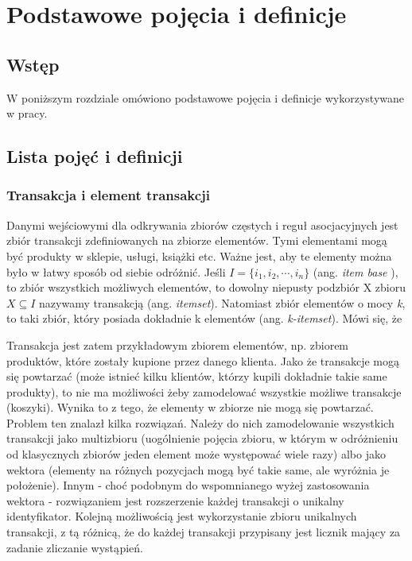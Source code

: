 \chapter{Podstawowe pojęcia i definicje}
\label{c2}

\section{Wstęp}
\label{c21}

W poniższym rozdziale omówiono podstawowe pojęcia i definicje wykorzystywane w pracy. 

\section{Lista pojęć i definicji}
\label{c22}

\subsection{Transakcja i element transakcji}
\label{c221}
Danymi wejściowymi dla odkrywania zbiorów częstych i reguł asocjacyjnych jest zbiór transakcji zdefiniowanych na zbiorze elementów. Tymi elementami mogą być produkty w sklepie, usługi, książki etc. Ważne jest, aby te elementy można było w łatwy sposób od siebie odróżnić. Jeśli \( I = \{ i_1, i_2, \cdots, i_n \}\)  (ang. \textit {item base} ), to zbiór wszystkich możliwych elementów, to dowolny niepusty podzbiór X zbioru \(X\subseteq I\) nazywamy transakcją (ang. \textit{itemset}). Natomiast zbiór elementów o mocy \textit{k}, to taki zbiór, który posiada dokładnie k elementów (ang. \textit{k-itemset}). Mówi się, że 

Transakcja jest zatem przykładowym zbiorem elementów, np. zbiorem produktów, które zostały kupione przez danego klienta. Jako że transakcje mogą się powtarzać (może istnieć kilku klientów, którzy kupili dokładnie takie same produkty), to nie ma możliwości żeby zamodelować wszystkie możliwe transakcje (koszyki). Wynika to z tego, że elementy w zbiorze nie mogą się powtarzać. Problem ten znalazł kilka rozwiązań. Należy do nich zamodelowanie wszystkich transakcji jako multizbioru (uogólnienie pojęcia zbioru, w którym w odróżnieniu od klasycznych zbiorów jeden element może występować wiele razy) albo jako wektora (elementy na różnych pozycjach mogą być takie same, ale wyróżnia je położenie). Innym - choć podobnym do wspomnianego wyżej zastosowania wektora - rozwiązaniem jest rozszerzenie każdej transakcji o unikalny identyfikator. Kolejną możliwością jest wykorzystanie zbioru unikalnych transakcji, z tą różnicą, że do każdej transakcji przypisany jest licznik mający za zadanie zliczanie wystąpień.

